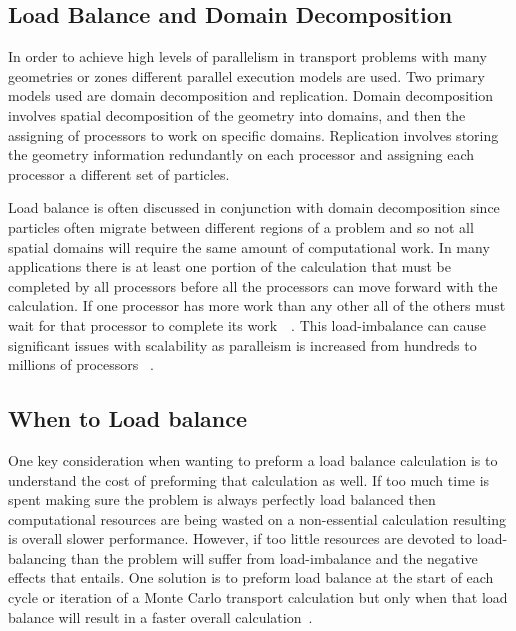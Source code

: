 \subsection{ \textbf{ Load Balance and Domain Decomposition} }

In order to achieve high levels of parallelism in transport problems with many geometries or zones different parallel execution models are used.
%
Two primary models used are domain decomposition and replication.
%
Domain decomposition involves spatial decomposition of the geometry into domains, and then the assigning of processors to work on specific domains.
%
Replication involves storing the geometry information redundantly on each processor and assigning each processor a different set of particles.
~\cite{procassini2005load}
~\cite{o2005dynamic}


Load balance is often discussed in conjunction with domain decomposition since particles often migrate between different regions of a problem and so not all spatial domains will require the same amount of computational work.
%
In many applications there is at least one portion of the calculation that must be completed by all processors before all the processors can move forward with the calculation.
%
If one processor has more work than any other all of the others must wait for that processor to complete its work~\cite{procassini2005load}~\cite{o2005dynamic}.
%
This load-imbalance can cause significant issues with scalability as paralleism is increased from hundreds to millions of processors ~\cite{o2013scalable}.
%

\subsection*{When to Load balance}

%
One key consideration when wanting to preform a load balance calculation is to understand the cost of preforming that calculation as well.
%
If too much time is spent making sure the problem is always perfectly load balanced then computational resources are being wasted on a non-essential calculation resulting is overall slower performance.
%
However, if too little resources are devoted to load-balancing than the problem will suffer from load-imbalance and the negative effects that entails.
%
One solution is to preform load balance at the start of each cycle or iteration of a Monte Carlo transport calculation but only when that load balance will result in a faster overall calculation~\cite{o2005dynamic}.
%

